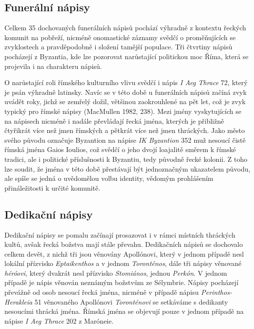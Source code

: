 \subsection[funerální-nápisy-10]{Funerální nápisy}

Celkem 35 dochovaných funerálních nápisů pochází výhradně z kontextu řeckých komunit na pobřeží, nicméně onomastické záznamy svědčí o proměňujících se zvyklostech a pravděpodobně i složení tamější populace. Tři čtvrtiny nápisů pocházejí z Byzantia, kde lze pozorovat narůstající politickou moc Říma, která se projevila i na charakteru nápisů.

O narůstající roli římského kulturního vlivu svědčí i nápis {\em I Aeg Thrace} 72, který je psán výhradně latinsky. Navíc se v této době u funerálních nápisů začíná zvyk uvádět roky, jichž se zemřelý dožil, většinou zaokrouhlené na pět let, což je zvyk typický pro římské nápisy (MacMullen 1982, 238). Mezi jmény vyskytujících se na nápisech nicméně i nadále převládají řecká jména, kterých je přibližně čtyřikrát více než jmen římských a pětkrát více než jmen thráckých. Jako město svého původu označuje Byzantion na nápise {\em IK Byzantion} 352 muž nesoucí čistě římská jména Gaios Ioulios, což svědčí o jeho dvojí loajalitě směrem k římské tradici, ale i politické příslušnosti k Byzantiu, tedy původně řecké kolonii. Z toho lze soudit, že jména v této době přestávají být jednoznačným ukazatelem původu, ale spíše se jedná o uvědomělou volbu identity, vědomým prohlášením přináležitosti k určité komunitě.

\subsection[dedikační-nápisy-10]{Dedikační nápisy}

Dedikační nápisy se pomalu začínají prosazovat i v rámci místních thráckých kultů, avšak řecká božstva mají stále převahu. Dedikačních nápisů se dochovalo celkem devět, z nichž tři jsou věnovány Apollónovi, který v jednom případě nesl lokální přízvisko {\em Eptaikenthos} a v jednom {\em Toronténos}, dále tři nápisy věnované {\em héróovi}, který dvakrát nesl přízvisko {\em Stomiános}, jednou {\em Perkón}. V jednom případě je nápis věnován neznámým božstvům ze Sélymbrie. Nápisy pocházejí převážně od osob nesoucí řecká jména, nicméně v případě nápisu {\em Perinthos-Herakleia} 51 věnovaného Apollónovi {\em Toronténovi} se setkáváme s dedikanty nesoucími thrácká jména. Římská jména se objevují pouze v jednom případě na nápise {\em I Aeg Thrace} 202 z Maróneie.

